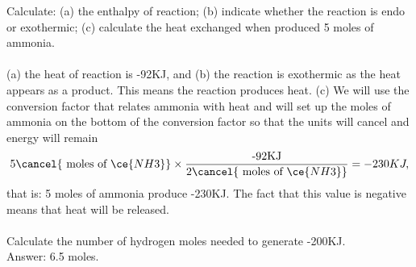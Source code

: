 \documentclass[main.tex]{subfiles}
\begin{document}
\begin{description}
\begin{example}
Calculate: (a) the enthalpy of reaction; (b) indicate whether the reaction is endo or exothermic; (c) calculate the heat exchanged when produced 5 moles of ammonia.\\
\\
(a) the heat of reaction is -92KJ, and (b) the reaction is exothermic as the heat appears as a product. This means the reaction produces heat.
(c) We will use the conversion factor that relates ammonia with heat and will set up the moles of ammonia on the bottom of the conversion factor so that the units will cancel and energy will remain
\begin{equation*}
5\cancel{\text{ moles of }\ce{NH3}} \times \dfrac{\text{-92KJ}}{2\cancel{\text{ moles of }\ce{NH3}}}=-230KJ,
\end{equation*}
that is: 5 moles of ammonia produce -230KJ. The fact that this value is negative means that heat will be released.
\\
\faDiamond\ \\
Calculate the number of hydrogen moles needed to generate -200KJ. \\
\flushright Answer: 6.5 moles.
\end{example}%
  

  

















  \end{description}
\end{document}
